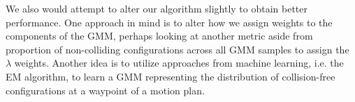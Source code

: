 \documentclass[journal]{IEEEtran}
\begin{document}
We also would attempt to alter our algorithm slightly to obtain better performance. One approach in mind is to alter how we assign weights to the components of the GMM, perhaps looking at another metric aside from proportion of non-colliding configurations across all GMM samples to assign the $\lambda$ weights. Another idea is to utilize approaches from machine learning, i.e. the EM algorithm, to learn a GMM representing the distribution of collision-free configurations at a waypoint of a motion plan.

%
%



%
%
\end{document}

